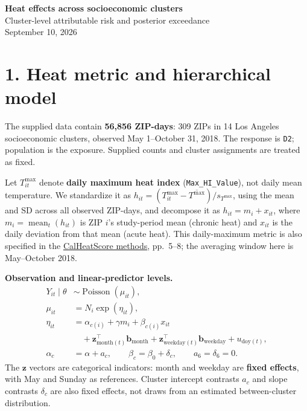 \documentclass[10pt,letterpaper]{article}
\begin{document}
\begin{center}
{\Large\bfseries Heat effects across socioeconomic clusters}\\[3pt]
{\large Cluster-level attributable risk and posterior exceedance}\\[3pt]
September 10, 2026
\end{center}

\section*{1. Heat metric and hierarchical model}
The supplied data contain \textbf{56,856 ZIP-days}: 309 ZIPs in 14 Los Angeles socioeconomic clusters, observed May 1--October 31, 2018. The response is \texttt{D2}; population is the exposure. Supplied counts and cluster assignments are treated as fixed.

Let $T^{\max}_{it}$ denote \textbf{daily maximum heat index} (\texttt{Max\_HI\_Value}), not daily mean temperature. We standardize it as $h_{it}=(T^{\max}_{it}-\overline{T^{\max}})/s_{T^{\max}}$, using the mean and SD across all observed ZIP-days, and decompose it as $h_{it}=m_i+x_{it}$, where $m_i=\operatorname{mean}_t(h_{it})$ is ZIP $i$'s study-period mean (chronic heat) and $x_{it}$ is the daily deviation from that mean (acute heat). This daily-maximum metric is also specified in the \href{https://calheatscore.calepa.ca.gov/sites/default/files/2026-02/methods_v2.pdf}{CalHeatScore methods}, pp.~5--8; the averaging window here is May--October 2018.

\textbf{Observation and linear-predictor levels.}
\begin{equation}
\begin{aligned}
Y_{it}\mid\theta &\sim \operatorname{Poisson}(\mu_{it}),\\
\mu_{it} &= N_i\exp(\eta_{it}),\\
\eta_{it} &= \alpha_{c(i)}+\gamma m_i+\beta_{c(i)}x_{it}\\
&\quad +\mathbf z_{\mathrm{month}(t)}^\top\mathbf b_{\mathrm{month}}
       +\mathbf z_{\mathrm{weekday}(t)}^\top\mathbf b_{\mathrm{weekday}}
       +u_{\mathrm{doy}(t)},\\
\alpha_c &= \alpha+a_c,\qquad
\beta_c=\beta_0+\delta_c,\qquad a_6=\delta_6=0.
\end{aligned}
\label{eq:model}
\end{equation}
The $\mathbf z$ vectors are categorical indicators: month and weekday are \textbf{fixed effects}, with May and Sunday as references. Cluster intercept contrasts $a_c$ and slope contrasts $\delta_c$ are also fixed effects, not draws from an estimated between-cluster distribution.
\end{document}
